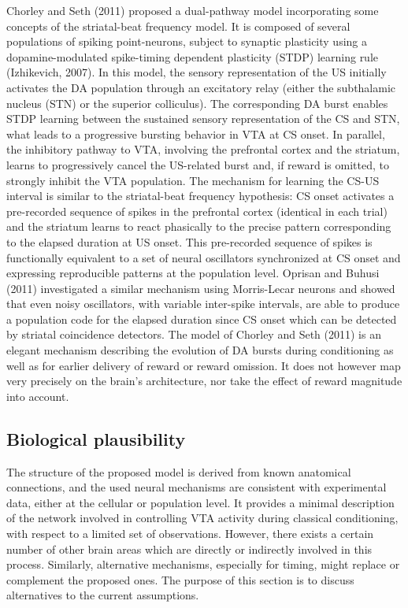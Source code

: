 \documentclass[
  11pt,
  a4paper,
]{scrbook}
\begin{document}
Chorley and Seth (2011) proposed a dual-pathway model incorporating some
concepts of the striatal-beat frequency model. It is composed of several
populations of spiking point-neurons, subject to synaptic plasticity
using a dopamine-modulated spike-timing dependent plasticity (STDP)
learning rule (Izhikevich, 2007). In this model, the sensory
representation of the US initially activates the DA population through
an excitatory relay (either the subthalamic nucleus (STN) or the
superior colliculus). The corresponding DA burst enables STDP learning
between the sustained sensory representation of the CS and STN, what
leads to a progressive bursting behavior in VTA at CS onset. In
parallel, the inhibitory pathway to VTA, involving the prefrontal cortex
and the striatum, learns to progressively cancel the US-related burst
and, if reward is omitted, to strongly inhibit the VTA population. The
mechanism for learning the CS-US interval is similar to the
striatal-beat frequency hypothesis: CS onset activates a pre-recorded
sequence of spikes in the prefrontal cortex (identical in each trial)
and the striatum learns to react phasically to the precise pattern
corresponding to the elapsed duration at US onset. This pre-recorded
sequence of spikes is functionally equivalent to a set of neural
oscillators synchronized at CS onset and expressing reproducible
patterns at the population level. Oprisan and Buhusi (2011) investigated
a similar mechanism using Morris-Lecar neurons and showed that even
noisy oscillators, with variable inter-spike intervals, are able to
produce a population code for the elapsed duration since CS onset which
can be detected by striatal coincidence detectors. The model of Chorley
and Seth (2011) is an elegant mechanism describing the evolution of DA
bursts during conditioning as well as for earlier delivery of reward or
reward omission. It does not however map very precisely on the brain's
architecture, nor take the effect of reward magnitude into account.

\subsection{Biological plausibility}\label{sec-finr:discussion-bio}

The structure of the proposed model is derived from known anatomical
connections, and the used neural mechanisms are consistent with
experimental data, either at the cellular or population level. It
provides a minimal description of the network involved in controlling
VTA activity during classical conditioning, with respect to a limited
set of observations. However, there exists a certain number of other
brain areas which are directly or indirectly involved in this process.
Similarly, alternative mechanisms, especially for timing, might replace
or complement the proposed ones. The purpose of this section is to
discuss alternatives to the current assumptions.
\end{document}
